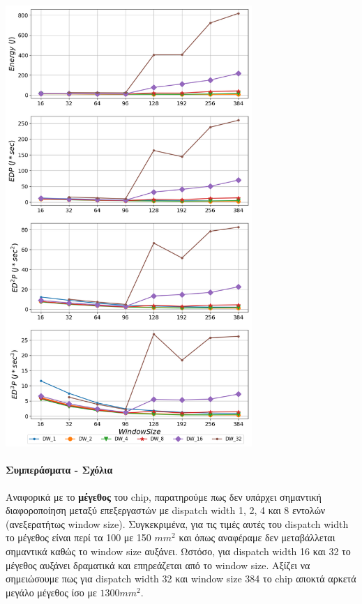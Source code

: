    \begin{minipage}{\textwidth}
      \begin{center}
         \\
         \vspace{3mm}
         \includegraphics[width=0.7\textwidth]{./graphs/edp/GemsFDTD.png}
         \vspace{6mm}
      \end{center}
   \end{minipage}



   \paragraph{Συμπεράσματα - Σχόλια}
   Αναφορικά με το \textbf{μέγεθος} του chip, παρατηρούμε πως δεν υπάρχει
   σημαντική διαφοροποίηση μεταξύ επεξεργαστών με dispatch width 1, 2, 4 και 8
   εντολών (ανεξερατήτως window size). Συγκεκριμένα, για τις τιμές αυτές του
   dispatch width το μέγεθος είναι περί τα 100 με 150 $mm^2$ και όπως αναφέραμε
   δεν μεταβάλλεται σημαντικά καθώς το window size αυξάνει. Ωστόσο, για dispatch
   width 16 και 32 το μέγεθος αυξάνει δραματικά και επηρεάζεται από το window
   size. Αξίζει να σημειώσουμε πως για dispatch width 32 και window size 384 το
   chip αποκτά αρκετά μεγάλο μέγεθος ίσο με $1300 mm^2$.

